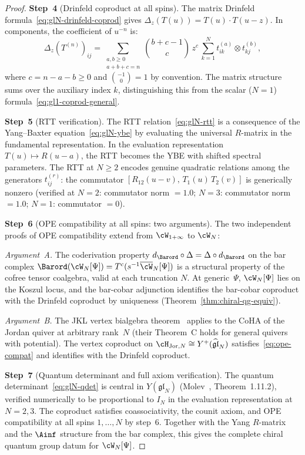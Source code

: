 \begin{proof}
\medskip
\noindent
\textbf{Step~4}
(Drinfeld coproduct at all spins).
The matrix Drinfeld
formula~\eqref{eq:glN-drinfeld-coprod} gives
$\Delta_z(T(u)) = T(u) \cdot T(u - z)$. In components,
the coefficient of $u^{-n}$ is:
\[
  \Delta_z(T^{(n)})_{ij}
  = \sum_{\substack{a,b \geq 0 \\ a+b+c = n}}
  \binom{b+c-1}{c}\, z^c\,
  \sum_{k=1}^{N}
  t_{ik}^{(a)} \otimes t_{kj}^{(b)},
\]
where $c = n - a - b \geq 0$ and
$\binom{-1}{0} = 1$ by convention. The matrix structure
sums over the auxiliary index $k$, distinguishing this from
the scalar ($N = 1$) formula~\eqref{eq:gl1-coprod-general}.

\medskip
\noindent
\textbf{Step~5}
(RTT verification).
The RTT relation~\eqref{eq:glN-rtt} is a consequence of
the Yang--Baxter equation~\eqref{eq:glN-ybe} by
evaluating the universal $R$-matrix in the
fundamental representation. In the evaluation
representation $T(u) \mapsto R(u - a)$, the RTT becomes
the YBE with shifted spectral parameters.
The RTT at
$N \geq 2$ encodes genuine quadratic relations among the
generators $t_{ij}^{(r)}$: the commutator
$[R_{12}(u-v),\, T_1(u)\, T_2(v)]$ is generically nonzero
(verified at $N = 2$: commutator norm $= 1.0$;
$N = 3$: commutator norm $= 1.0$;
$N = 1$: commutator $= 0$).

\medskip
\noindent
\textbf{Step~6}
(OPE compatibility at all spins: two arguments).
The two independent proofs of OPE compatibility extend
from $\cW_{1+\infty}$ to $\cW_N$:

\smallskip
\noindent\emph{Argument~A.}
The coderivation property
$d_{\Barord} \circ \Delta = \Delta \circ d_{\Barord}$
on the bar complex $\Barord(\cW_N[\Psi])
= T^c(s^{-1}\overline{\cW}_N[\Psi])$
is a structural property of the cofree tensor coalgebra,
valid at each truncation $N$. At generic~$\Psi$,
$\cW_N[\Psi]$ lies on the Koszul locus, and the
bar-cobar adjunction identifies the bar-cobar coproduct
with the Drinfeld coproduct by uniqueness
(Theorem~\ref{thm:chiral-qg-equiv}).

\smallskip
\noindent\emph{Argument~B.}
The JKL vertex bialgebra theorem~\cite{JKL26} applies to
the CoHA of the Jordan quiver at arbitrary rank~$N$
(their Theorem~C holds for general quivers with
potential). The vertex coproduct on
$\cH_{\mathrm{Jor},N}
\cong Y^+(\widehat{\mathfrak{gl}}_N)$
satisfies~\eqref{eq:ope-compat} and identifies with
the Drinfeld coproduct.

\medskip
\noindent
\textbf{Step~7}
(Quantum determinant and full axiom verification).
The quantum determinant~\eqref{eq:glN-qdet} is central
in $Y(\mathfrak{gl}_N)$
(Molev~\cite{Molev07}, Theorem~1.11.2),
verified numerically to be proportional to
$I_N$ in the evaluation representation at $N = 2, 3$.
The coproduct satisfies coassociativity, the counit axiom,
and OPE compatibility at all spins $1, \ldots, N$ by
step~6. Together with
the Yang $R$-matrix and the $\Ainf$ structure from the bar
complex, this gives the complete chiral quantum group
datum for $\cW_N[\Psi]$.
\end{proof}

